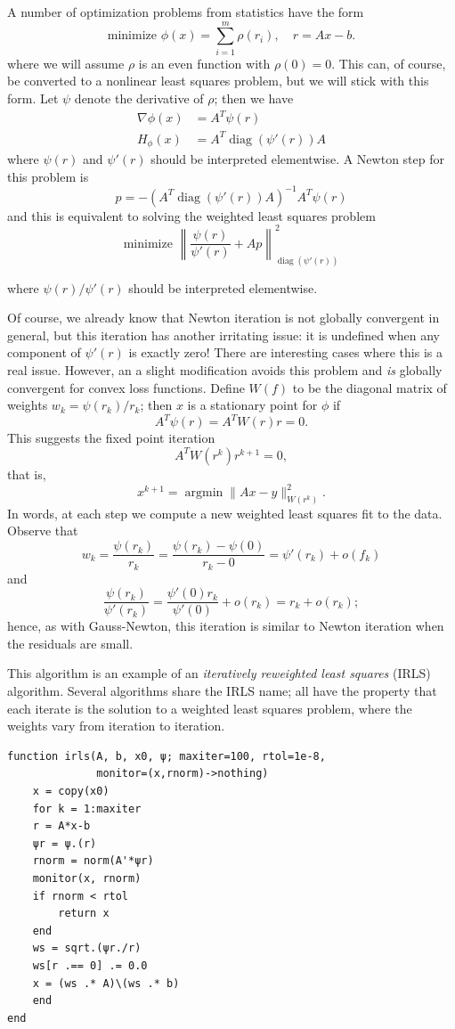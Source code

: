\documentclass[12pt, leqno]{article} %
\begin{document}
A number of optimization problems from statistics have the form
\[\mbox{minimize } \phi(x) = \sum_{i=1}^m \rho(r_i), \quad r = Ax-b.\]
where we will assume \(\rho\) is an even function with \(\rho(0) = 0\).
This can, of course, be converted to a nonlinear least squares problem,
but we will stick with this form. Let \(\psi\) denote the derivative of
\(\rho\); then we have \begin{align*}
  \nabla \phi(x) &= A^T \psi(r) \\
  H_{\phi}(x) &= A^T \operatorname{diag}(\psi'(r)) A
\end{align*} where \(\psi(r)\) and \(\psi'(r)\) should be interpreted
elementwise. A Newton step for this problem is
\[p = -(A^T \operatorname{diag}(\psi'(r)) A)^{-1} A^T \psi(r)\] and this
is equivalent to solving the weighted least squares problem
\[\mbox{minimize } 
  \left\| 
    \frac{\psi(r)}{\psi'(r)} + Ap 
  \right\|_{\operatorname{diag}(\psi'(r))}^2\]

where \(\psi(r)/\psi'(r)\) should be interpreted elementwise.

Of course, we already know that Newton iteration is not globally
convergent in general, but this iteration has another irritating issue:
it is undefined when any component of \(\psi'(r)\) is exactly zero!
There are interesting cases where this is a real issue. However, an a
slight modification avoids this problem and \emph{is} globally
convergent for convex loss functions. Define \(W(f)\) to be the diagonal
matrix of weights \(w_k = \psi(r_k)/r_k\); then \(x\) is a stationary
point for \(\phi\) if \[A^T \psi(r) = A^T W(r) r = 0.\] This suggests
the fixed point iteration \[A^T W(r^k) r^{k+1} = 0,\] that is,
\[x^{k+1} = \operatorname{argmin} \|Ax-y\|_{W(r^k)}^2.\] In words, at
each step we compute a new weighted least squares fit to the data.
Observe that
\[w_k = \frac{\psi(r_k)}{r_k} = \frac{\psi(r_k)-\psi(0)}{r_k-0} =
  \psi'(r_k) + o(f_k)\] and
\[\frac{\psi(r_k)}{\psi'(r_k)} = \frac{\psi'(0) r_k}{\psi'(0)} +
  o(r_k) = r_k + o(r_k);\] hence, as with Gauss-Newton, this iteration
is similar to Newton iteration when the residuals are small.

This algorithm is an example of an \emph{iteratively reweighted least
squares} (IRLS) algorithm. Several algorithms share the IRLS name; all
have the property that each iterate is the solution to a weighted least
squares problem, where the weights vary from iteration to iteration.

\begin{verbatim}
function irls(A, b, x0, ψ; maxiter=100, rtol=1e-8,
              monitor=(x,rnorm)->nothing)
    x = copy(x0)
    for k = 1:maxiter
	r = A*x-b
	ψr = ψ.(r)
	rnorm = norm(A'*ψr)
	monitor(x, rnorm)
	if rnorm < rtol
	    return x
	end
	ws = sqrt.(ψr./r)
	ws[r .== 0] .= 0.0
	x = (ws .* A)\(ws .* b)
    end
end
\end{verbatim}
\end{document}
